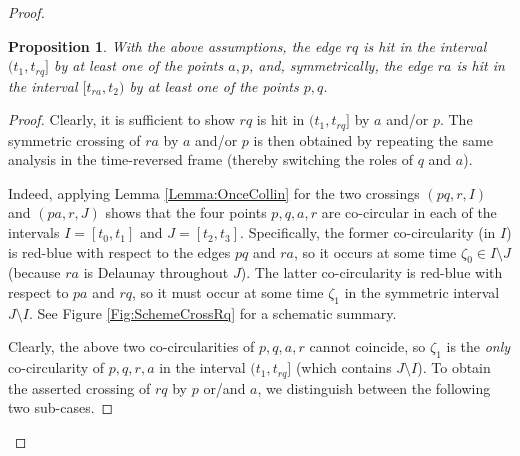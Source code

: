 \documentclass[letter,11pt]{article}
\newtheorem{proposition}[theorem]{Proposition}
\begin{document}
\begin{proof}
\begin{proposition}\label{Prop:ExtraCollin}
With the above assumptions, the edge $rq$ is hit in the interval $(t_1,t_{rq}]$ by at least one of the points $a,p$, and, symmetrically, the edge $ra$ is hit in the interval $[t_{ra},t_2)$ by at least one of the points $p,q$.
\end{proposition}
\begin{proof}
Clearly, it is sufficient to show $rq$ is hit in $(t_1,t_{rq}]$ by $a$ and/or $p$. The symmetric crossing of $ra$ by $a$ and/or $p$ is then obtained by repeating the same analysis in the time-reversed frame (thereby switching the roles of $q$ and $a$).

Indeed, applying Lemma \ref{Lemma:OnceCollin} for the two crossings $(pq,r,I)$ and $(pa,r,J)$ shows that the four points $p,q,a,r$ are co-circular in each of the intervals $I=[t_0,t_1]$ and $J=[t_2,t_3]$. Specifically, the former co-circularity (in $I$) is red-blue with respect to the edges $pq$ and $ra$, so it occurs at some time $\zeta_0\in I\setminus J$ (because $ra$ is Delaunay throughout $J$). The latter co-circularity is red-blue with respect to $pa$ and $rq$, so it must occur at some time $\zeta_1$ in the symmetric interval $J\setminus I$. See Figure \ref{Fig:SchemeCrossRq} for a schematic summary.



Clearly, the above two co-circularities of $p,q,a,r$ cannot coincide, so $\zeta_1$ is the {\it only} co-circularity of $p,q,r,a$ in the interval $(t_1,t_{rq}]$ (which contains $J\setminus I$). 
To obtain the asserted crossing of $rq$ by $p$ or/and $a$, we distinguish between the following two sub-cases.



\end{proof}
\end{proof}
\end{document}
